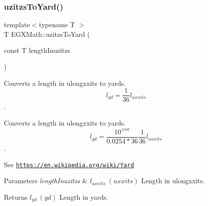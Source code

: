 \subsubsection{\texorpdfstring{uzitzs\+To\+Yard()}{uzitzsToYard()}}
{\footnotesize\ttfamily template$<$typename T $>$ \\
T E\+G\+X\+Math\+::uzitzs\+To\+Yard (\begin{DoxyParamCaption}\item[{const T}]{length\+Inuzitzs }\end{DoxyParamCaption})}



Converts a length in ulongxxits to yards. \[ l_{yd}= \frac{1}{36} l_{uxxits} \]. 

Converts a length in ulongxxits to yards. \[ l_{yd}= \frac{10^{zrat}}{0.0254 * 36} \frac{1}{36} l_{uxxits} \].

See \href{https://en.wikipedia.org/wiki/Yard}{\tt https\+://en.\+wikipedia.\+org/wiki/\+Yard} 
\begin{DoxyParams}{Parameters}
{\em length\+Inuzitzs} & $ l_{uxxits}\ (uxxits)$ Length in ulongxxits. \\
\hline
\end{DoxyParams}
\begin{DoxyReturn}{Returns}
$ l_{yd}\ (yd)$ Length in yards. 
\end{DoxyReturn}
